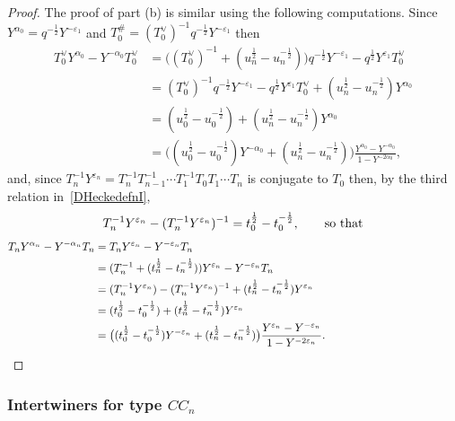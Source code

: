 \documentclass[11pt]{article}
\theoremstyle{plain}
\theoremstyle{definition}
\theoremstyle{remark}
\numberwithin{equation}{section}
\newcounter{r}
\newcounter{s}
\begin{document}
\begin{proof}
The proof of part (b) is similar using the following computations.
Since $Y^{\alpha_0} = q^{-\frac12}Y^{-\varepsilon_1}$
and
$T_0^\# = (T_0^{\vee})^{-1}q^{-\frac12}Y^{-\varepsilon_1}$ then
\begin{align*}
T_0^{\vee} Y^{\alpha_0} - Y^{-\alpha_0}T_0^{\vee} 
&= \big((T_0^{\vee})^{-1} + (u_n^{\frac12}-u_n^{-\frac12})\big) q^{-\frac12}Y^{-\varepsilon_1}
-q^{\frac12}Y^{\varepsilon_1}T_0^{\vee} \\
&= (T_0^{\vee})^{-1}q^{-\frac12}Y^{-\varepsilon_1} - q^{\frac12}Y^{\varepsilon_1}T_0^{\vee}
+(u_n^{\frac12} - u_n^{-\frac12})Y^{\alpha_0} \\
&= (u_0^{\frac12}-u_0^{-\frac12}) + ( u_n^{\frac12} - u_n^{-\frac12})Y^{\alpha_0} \\
&=\big( (u_0^{\frac12} - u_0^{-\frac12})Y^{-\alpha_0} + (u_n^{\frac12} - u_n^{-\frac12})\big)
\frac{Y^{\alpha_0} - Y^{-\alpha_0}}{1-Y^{-2\alpha_0}},
\end{align*}
and, since
$T_n^{-1}Y^{\varepsilon_n} = T_n^{-1}T_{n-1}^{-1}\cdots T_1^{-1}T_0T_1\cdots T_n$
is conjugate to $T_0$ then, by the third relation in~\eqref{DHeckedefnI},
$$T_n^{-1}Y^{\varepsilon_n} - (T_n^{-1}Y^{\varepsilon_n})^{-1}
=t_0^{\frac12}- t_0^{-\frac12}, \qquad\hbox{so that}
$$
\begin{align*}
T_nY^{\alpha_n} - Y^{-\alpha_n}T_n 
&= T_nY^{\varepsilon_n}-Y^{-\varepsilon_n}T_n \\
&= (T_n^{-1}+(t_n^{\frac12}-t_n^{-\frac12}))Y^{\varepsilon_n} - Y^{-\varepsilon_n}T_n \\
&= (T_n^{-1}Y^{\varepsilon_n}) - (T_n^{-1}Y^{\varepsilon_n})^{-1} 
+ (t_n^{\frac12}-t_n^{-\frac12})Y^{\varepsilon_n} \\
&= (t_0^{\frac12}-t_0^{-\frac12}) 
+ (t_n^{\frac12}-t_n^{-\frac12})Y^{\varepsilon_n} \\
&= \big( (t_0^{\frac12} - t_0^{-\frac12})Y^{-\varepsilon_n} + (t_n^{\frac12}-t_n^{-\frac12})\big)
\frac{Y^{\varepsilon_n} - Y^{-\varepsilon_n}}{1-Y^{-2\varepsilon_n}}.
\qquad\qquad\qquad\qquad\qquad\qquad\qedhere
\end{align*}
\end{proof}



\subsubsection{Intertwiners for type $CC_n$}
\end{document}
